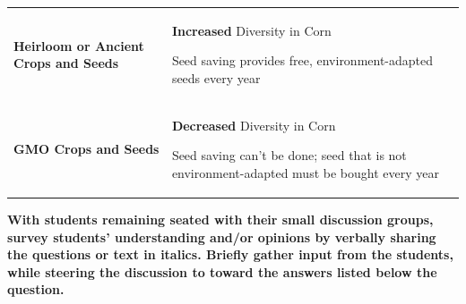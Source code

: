 \documentclass[12pt,]{article}
\begin{document}
\begin{longtable}[]{@{}ll@{}}
\toprule
\endhead
\begin{minipage}[t]{0.47\columnwidth}\raggedright
\textbf{Heirloom or Ancient Crops and
Seeds}\strut
\end{minipage} & \begin{minipage}[t]{0.47\columnwidth}\raggedright
\textbf{Increased} Diversity in Corn

Seed saving provides free,
environment-adapted seeds every
year\strut
\end{minipage}\tabularnewline
\begin{minipage}[t]{0.47\columnwidth}\raggedright
\textbf{GMO Crops and Seeds}\strut
\end{minipage} & \begin{minipage}[t]{0.47\columnwidth}\raggedright
\textbf{Decreased} Diversity in Corn

Seed saving can't be done; seed
that is not environment-adapted
must be bought every year\strut
\end{minipage}\tabularnewline
\bottomrule
\end{longtable}

\textbf{With students remaining seated with their small discussion groups,
survey students' understanding and/or opinions by verbally sharing the
questions or text in italics. Briefly gather input from the students,
while steering the discussion to toward the answers listed below the
question.}
\end{document}
